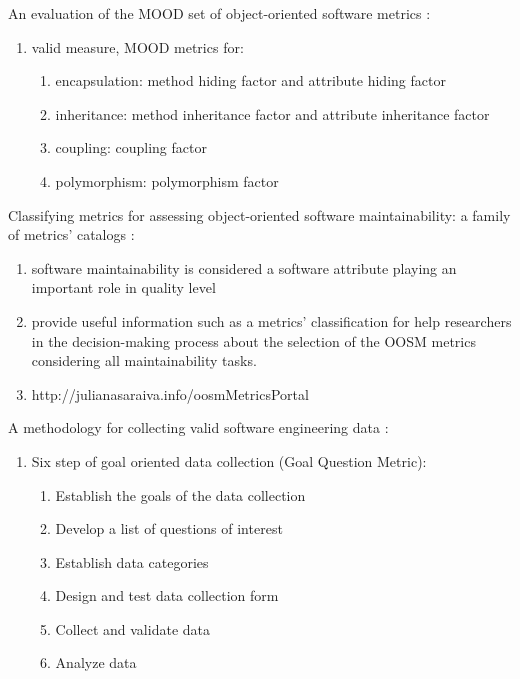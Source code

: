 \noindent An evaluation of the MOOD set of object-oriented software metrics \cite{harrison1998evaluation}:

\begin{enumerate}
    \item valid measure, MOOD metrics for:
    \begin{enumerate}
        \item encapsulation: method hiding factor and attribute hiding factor
        \item inheritance: method inheritance factor and attribute inheritance factor
        \item coupling: coupling factor
        \item polymorphism: polymorphism factor
    \end{enumerate}
\end{enumerate}

\noindent Classifying metrics for assessing object-oriented software maintainability: a family of metrics' catalogs \cite{de2015classifying}:

\begin{enumerate}
    \item software maintainability is considered a software attribute playing an important role in quality level
    \item provide useful information such as a metrics' classification for help researchers in the decision-making process about the selection of the OOSM metrics considering all maintainability tasks.
    \item http://julianasaraiva.info/oosmMetricsPortal
\end{enumerate}

\noindent A methodology for collecting valid software engineering data \cite{basili1984methodology}:

\begin{enumerate}
    \item Six step of goal oriented data collection (Goal Question Metric):
    \begin{enumerate}
        \item Establish the goals of the data collection
        \item Develop a list of questions of interest
        \item Establish data categories
        \item Design and test data collection form
        \item Collect and validate data
        \item Analyze data
    \end{enumerate}
\end{enumerate}

